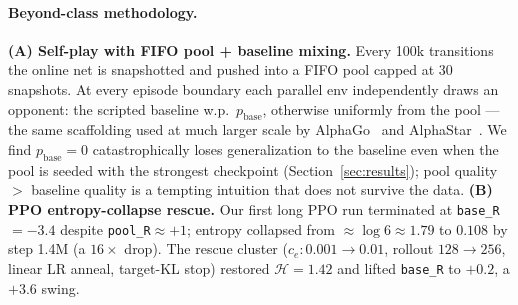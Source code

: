 \paragraph{Beyond-class methodology.} \textbf{(A) Self-play with FIFO
pool + baseline mixing.} Every 100k transitions the online net is
snapshotted and pushed into a FIFO pool capped at 30 snapshots. At
every episode boundary each parallel env independently draws an
opponent: the scripted baseline w.p.~$p_{\mathrm{base}}$, otherwise
uniformly from the pool --- the same scaffolding used at much larger
scale by AlphaGo~\citep{silver2016alphago} and
AlphaStar~\citep{vinyals2019alphastar}. We find
$p_{\mathrm{base}}{=}0$ catastrophically loses generalization to the
baseline even when the pool is seeded with the strongest checkpoint
(Section~\ref{sec:results}); pool quality $>$ baseline quality is a
tempting intuition that does not survive the data. \textbf{(B) PPO
entropy-collapse rescue.} Our first long PPO run terminated at
\texttt{base\_R}$=-3.4$ despite \texttt{pool\_R}$\approx +1$; entropy
collapsed from $\approx\!\log 6\!\approx\!1.79$ to $0.108$ by step
1.4M (a $16\times$ drop). The rescue cluster
($c_e:0.001{\to}0.01$, rollout $128{\to}256$, linear LR anneal,
target-KL stop) restored $\mathcal{H}=1.42$ and lifted
\texttt{base\_R} to $+0.2$, a $+3.6$ swing.
